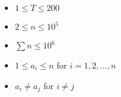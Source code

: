 \begin{itemize}
\tightlist
\item $1 \leq T \leq 200$
\item $2 \leq n \leq 10^5$
\item $\sum n \leq 10^6$
\item $1 \leq a_i \leq n$ for $i = 1,2,\ldots,n$
\item $a_i \neq a_j$ for $i \neq j$
\end{itemize}